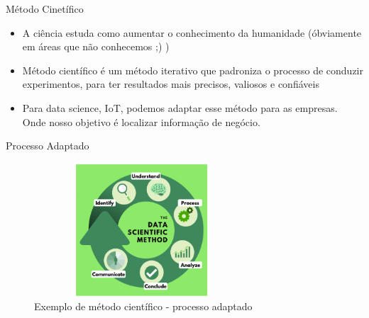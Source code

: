 \begin{frame}
	\begin{block}{Método Cinetífico}
		  \begin{itemize}

			  \item  A ciência estuda como aumentar o conhecimento da humanidade (óbviamente em áreas que não conhecemos ;) )
			  
			  \item Método científico é um método iterativo que padroniza o processo de conduzir experimentos, para ter resultados mais precisos, valiosos e confiáveis
			  
			  \item Para data science, IoT, podemos adaptar esse método para as empresas. Onde nosso objetivo é localizar informação de negócio.

		  \end{itemize}
	\end{block}
\end{frame}


\begin{frame}
	\begin{block}{Processo Adaptado}
		\begin{figure}[!htb]
			\centering	  				
			\includegraphics[height=5cm, width = 8cm]{./pic/metodoAdaptado.png}
			\caption{Exemplo de método científico - processo adaptado}
		\end{figure}
	\end{block}
\end{frame}


